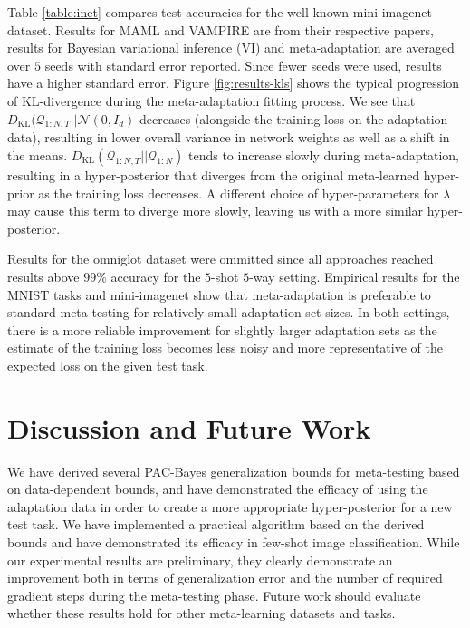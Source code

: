 \documentclass{article} %
\theoremstyle{definition}
\begin{document}
Table \ref{table:inet} compares test accuracies for the well-known mini-imagenet \citep{Vinyals2016} dataset. Results for MAML \citep{Finn2017} and VAMPIRE \citep{nguyen2020} are from their respective papers, results for Bayesian variational inference (VI) and meta-adaptation are averaged over $5$ seeds with standard error reported. Since fewer seeds were used, results have a higher standard error.
Figure \ref{fig:results-kls} shows the typical progression of KL-divergence during the meta-adaptation fitting process. We see that $D_{\mathrm{KL}}(\mathcal{Q}_{1:N,T}||\mathcal{N}(0,I_d)$ decreases (alongside the training loss on the adaptation data), resulting in lower overall variance in network weights as well as a shift in the means. $D_{\mathrm{KL}}(\mathcal{Q}_{1:N,T}||\mathcal{Q}_{1:N})$ tends to increase slowly during meta-adaptation, resulting in a hyper-posterior that diverges from the original meta-learned hyper-prior as the training loss decreases. A different choice of hyper-parameters for $\lambda$ may cause this term to diverge more slowly, leaving us with a more similar hyper-posterior.

Results for the omniglot \citep{Vinyals2016} dataset were ommitted since all approaches reached results above $99\%$ accuracy for the $5$-shot $5$-way setting. Empirical results for the MNIST tasks and mini-imagenet show that meta-adaptation is preferable to standard meta-testing for relatively small adaptation set sizes. In both settings, there is a more reliable improvement for slightly larger adaptation sets as the estimate of the training loss becomes less noisy and more representative of the expected loss on the given test task.

\section{Discussion and Future Work}

We have derived several PAC-Bayes generalization bounds for meta-testing based on data-dependent bounds, and have demonstrated the efficacy of using the adaptation data in order to create a more appropriate hyper-posterior for a new test task.
We have implemented a practical algorithm based on the derived bounds and have demonstrated its efficacy in few-shot image classification.
While our experimental results are preliminary, they clearly demonstrate an improvement both in terms of generalization error and the number of required gradient steps during the meta-testing phase. Future work should evaluate whether these results hold for other meta-learning datasets and tasks.
\end{document}
